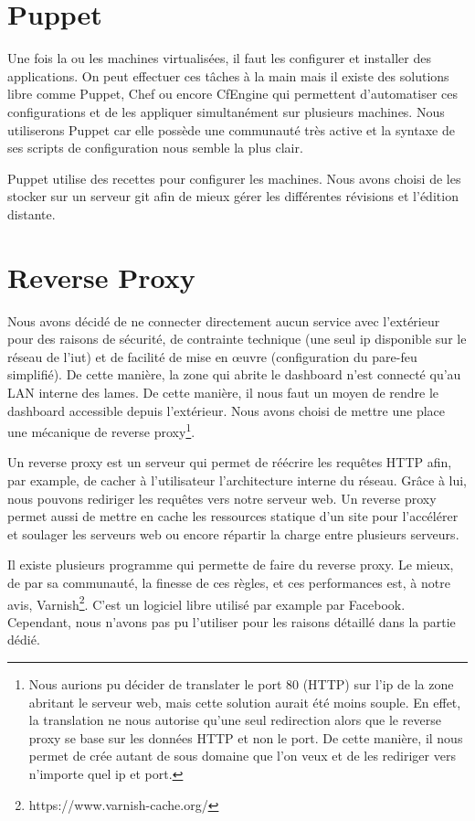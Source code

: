 \documentclass{report}
\begin{document}
\section{Puppet}
Une fois la ou les machines virtualisées, il faut les configurer et installer des applications. On peut effectuer ces tâches à la main mais il existe des solutions libre comme Puppet, Chef ou encore CfEngine qui permettent d'automatiser ces configurations et de les appliquer simultanément sur plusieurs machines. Nous utiliserons Puppet car elle possède une communauté très active et la syntaxe de ses scripts de configuration nous semble la plus clair.

Puppet utilise des recettes pour configurer les machines. Nous avons choisi de les stocker sur un serveur git afin de mieux gérer les différentes révisions et l'édition distante.

\section{Reverse Proxy}
Nous avons décidé de ne connecter directement aucun service avec l'extérieur pour des raisons de sécurité, de contrainte technique (une seul ip disponible sur le réseau de l'iut) et de facilité de mise en œuvre (configuration du pare-feu simplifié). De cette manière, la zone qui abrite le dashboard n'est connecté qu'au LAN interne des lames. De cette manière, il nous faut un moyen de rendre le dashboard accessible depuis l'extérieur. Nous avons choisi de mettre une place une mécanique de reverse proxy\footnote{Nous aurions pu décider de translater le port 80 (HTTP) sur l'ip de la zone abritant le serveur web, mais cette solution aurait été moins souple. En effet, la translation ne nous autorise qu'une seul redirection alors que le reverse proxy se base sur les données HTTP et non le port. De cette manière, il nous permet de crée autant de sous domaine que l'on veux et de les rediriger vers n'importe quel ip et port.}.

Un reverse proxy est un serveur qui permet de réécrire les requêtes HTTP afin, par example, de cacher à l'utilisateur l'architecture interne du réseau. Grâce à lui, nous pouvons rediriger les requêtes vers notre serveur web.
Un reverse proxy permet aussi de mettre en cache les ressources statique d'un site pour l'accélérer et soulager les serveurs web ou encore répartir la charge entre plusieurs serveurs.

Il existe plusieurs programme qui permette de faire du reverse proxy. Le mieux, de par sa communauté, la finesse de ces règles, et ces performances est, à notre avis, Varnish\footnote{https://www.varnish-cache.org/}. C'est un logiciel libre utilisé par example par Facebook. Cependant, nous n'avons pas pu l'utiliser pour les raisons détaillé dans la partie dédié.
\end{document}
